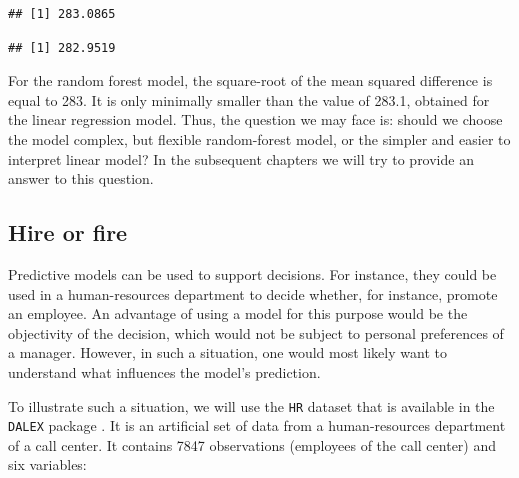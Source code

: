 \documentclass[12pt,]{krantz}
\newenvironment{Shaded}{\begin{snugshade}}{\end{snugshade}}
\newcommand{\DecValTok}[1]{\textcolor[rgb]{0.00,0.00,0.81}{#1}}
\newcommand{\KeywordTok}[1]{\textcolor[rgb]{0.13,0.29,0.53}{\textbf{#1}}}
\newcommand{\NormalTok}[1]{#1}
\newcommand{\OperatorTok}[1]{\textcolor[rgb]{0.81,0.36,0.00}{\textbf{#1}}}
\newcommand{\StringTok}[1]{\textcolor[rgb]{0.31,0.60,0.02}{#1}}
\theoremstyle{definition}
\theoremstyle{definition}
\theoremstyle{definition}
\theoremstyle{remark}
\begin{document}
\begin{verbatim}
## [1] 283.0865
\end{verbatim}

\begin{Shaded}
\end{Shaded}

\begin{verbatim}
## [1] 282.9519
\end{verbatim}

For the random forest model, the square-root of the mean squared
difference is equal to 283. It is only minimally smaller than the value
of 283.1, obtained for the linear regression model. Thus, the question
we may face is: should we choose the model complex, but flexible
random-forest model, or the simpler and easier to interpret linear
model? In the subsequent chapters we will try to provide an answer to
this question.

\hypertarget{HFDataset}{%
\subsection{Hire or fire}\label{HFDataset}}

Predictive models can be used to support decisions. For instance, they
could be used in a human-resources department to decide whether, for
instance, promote an employee. An advantage of using a model for this
purpose would be the objectivity of the decision, which would not be
subject to personal preferences of a manager. However, in such a
situation, one would most likely want to understand what influences the
model's prediction.

To illustrate such a situation, we will use the \texttt{HR} dataset that
is available in the \texttt{DALEX} package \citep{R-DALEX}. It is an
artificial set of data from a human-resources department of a call
center. It contains 7847 observations (employees of the call center) and
six variables:
\end{document}
